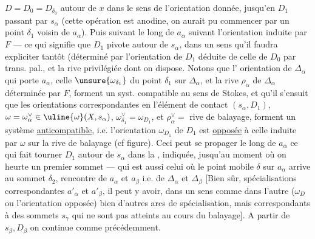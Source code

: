 $D=D_0=D_{\delta_0}$ autour de $x$ dans le sens de
l'orientation donnée, jusqu'en $D_1$ passant
par $s_\alpha$ (cette opération est anodine,
on aurait pu commencer par un point
$\delta_1$ voisin de $a_\alpha$). Puis suivant le long de
$a_\alpha$ suivant l'orientation induite par $F$
--- ce qui signifie que $D_1$ pivote autour de
$s_\alpha$, dans un sens qu'il faudra expliciter
tantôt (déterminé par l'orientation de $D_1$ déduite
de celle de $D_0$ par trans. pal., et la rive
privilégiée dont on dispose. Notons que l'
orientation \inserted{$\omega_\alpha$} de $\Delta_\alpha$ qui porte $a_\alpha$, celle $\unsure{\omega_{\delta_1}}$ du point
$\delta_1$ sur $\Delta_\alpha$, et la rive $\rho_\alpha$ de $\Delta_\alpha$ déterminée
par $F$, forment un syst. compatible au sens de
Stokes, et qu'il s'ensuit que les
orientations correspondantes en l'élément de
contact $(s_\alpha,D_1)$, $\omega=\omega_\alpha^\vee\in\uline{\omega}(X,s_\alpha)$, $\omega_{\delta_1}^\vee=\omega_{D_1}$, et
$\rho_\alpha^\vee=$ rive de balayage, forment un système
\uline{anticompatible}, i.e. l'orientation $\omega_{D_1}$ de $D_1$
est \uline{opposée} à celle induite par $\omega$ sur la
rive de balayage (cf figure). Ceci peut 
se propager le long de $a_\alpha$  ce qui fait tourner
$D_1$ autour de $s_\alpha$ dans la ,
indiquée, jusqu'au moment où
on heurte un premier sommet
 --- qui est aussi celui où le
point mobile $\delta$ sur $a_\alpha$ arrive
au sommet $\delta_2$, rencontre de
 $a_\alpha$ et $a_\beta$ i.e. de $\Delta_\alpha$ et $\Delta_\beta$
[Bien sûr,  
spécialisations correspondantes $a'_\alpha$ et
$a'_\beta$, il peut y avoir, dans un
sens comme dans l'autre
($\omega_D$ ou l'orientation opposée) bien
d'autres arcs de spécialisation, mais
correspondants à des sommets $s_\gamma$
qui ne sont pas atteints au cours
du balayage]. A partir de $s_\beta,D_\beta$
on continue comme précédemment.
